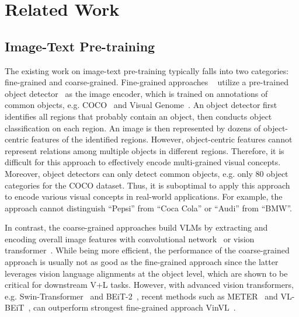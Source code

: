 \documentclass{article}
\begin{document}
 
\section{Related Work}
\label{sec:related}

\subsection{Image-Text Pre-training} 



The existing work on image-text pre-training typically falls into two categories: fine-grained and coarse-grained. Fine-grained approaches ~\cite{tan2019lxmert, lu2019vilbert, li2019visualbert, gan2020large, chen2020uniter, li2020oscar, zhang2021vinvl} utilize a pre-trained object detector~\cite{ren2015faster, anderson2018bottom} as the image encoder, which is trained on annotations of common objects, e.g. COCO~\cite{lin2014microsoft} and Visual Genome~\cite{krishna2016visual}. An object detector first identifies all regions that probably contain an object, then conducts object classification on each region. An image is then represented by dozens of object-centric features of the identified regions. However, object-centric features cannot represent relations among multiple objects in different regions. Therefore, it is difficult for this approach to effectively encode multi-grained visual concepts. Moreover, object detectors can only detect common objects, e.g. only 80 object categories for the COCO dataset. Thus, it is suboptimal to apply this approach to encode various visual concepts in real-world applications. For example, the approach cannot distinguish ``Pepsi'' from ``Coca Cola'' or ``Audi'' from ``BMW''. 

In contrast, the coarse-grained approaches build VLMs by extracting and encoding overall image features with convolutional network~\cite{jiang2020defense, huang2020pixel} or vision transformer~\cite{kim2021vilt, li2021align}. While being more efficient, the performance of the coarse-grained approach is usually not as good as the fine-grained approach since the latter leverages vision language alignments at the object level, which are shown to be critical for downstream V+L tasks. However, with advanced vision transformers, e.g. Swin-Transformer~\cite{liu2021swin} and BEiT-2~\cite{peng2022beit}, recent methods such as METER~\cite{dou2021empirical} and VL-BEiT~\cite{bao2022vl}, can outperform strongest fine-grained approach VinVL~\cite{zhang2021vinvl}. 
\end{document}
